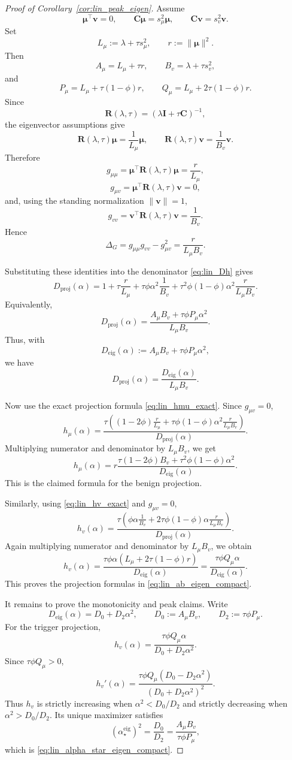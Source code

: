 \documentclass[11pt]{article}
\newcommand{\I}{\mathbf{I}}
\newcommand{\C}{\mathbf{C}}
\newcommand{\bv}{\mathbf{v}}
\newcommand{\bmu}{\boldsymbol{\mu}}
\begin{document}
\begin{proof}[Proof of Corollary~\ref{cor:lin_peak_eigen}]
Assume
\[
\bmu^\top\bv=0,
\qquad
\C\bmu=s_\mu^2\bmu,
\qquad
\C\bv=s_v^2\bv.
\]
Set
\[
L_\mu:=\lambda+\tau s_\mu^2,
\qquad
r:=\|\bmu\|^2.
\]
Then
\[
A_\mu=L_\mu+\tau r,
\qquad
B_v=\lambda+\tau s_v^2,
\]
and
\[
P_\mu=L_\mu+\tau(1-\phi)r,
\qquad
Q_\mu=L_\mu+2\tau(1-\phi)r.
\]
Since
\[
\mathbf{R}(\lambda,\tau)=(\lambda\I+\tau\C)^{-1},
\]
the eigenvector assumptions give
\[
\mathbf{R}(\lambda,\tau)\bmu=\frac{1}{L_\mu}\bmu,
\qquad
\mathbf{R}(\lambda,\tau)\bv=\frac{1}{B_v}\bv.
\]
Therefore
\[
g_{\mu\mu}
=
\bmu^\top \mathbf{R}(\lambda,\tau)\bmu
=
\frac{r}{L_\mu},
\]
\[
g_{\mu v}
=
\bmu^\top \mathbf{R}(\lambda,\tau)\bv
=
0,
\]
and, using the standing normalization \(\|\bv\|=1\),
\[
g_{vv}
=
\bv^\top \mathbf{R}(\lambda,\tau)\bv
=
\frac{1}{B_v}.
\]
Hence
\[
\Delta_G=g_{\mu\mu}g_{vv}-g_{\mu v}^2
=
\frac{r}{L_\mu B_v}.
\]

Substituting these identities into the denominator
\eqref{eq:lin_Dh} gives
\[
D_{\mathrm{proj}}(\alpha)
=
1+\tau\frac{r}{L_\mu}
+
\tau\phi\alpha^2\frac{1}{B_v}
+
\tau^2\phi(1-\phi)\alpha^2\frac{r}{L_\mu B_v}.
\]
Equivalently,
\[
D_{\mathrm{proj}}(\alpha)
=
\frac{
A_\mu B_v+\tau\phi P_\mu\alpha^2
}
{L_\mu B_v}.
\]
Thus, with
\[
D_{\mathrm{eig}}(\alpha):=A_\mu B_v+\tau\phi P_\mu\alpha^2,
\]
we have
\[
D_{\mathrm{proj}}(\alpha)
=
\frac{D_{\mathrm{eig}}(\alpha)}{L_\mu B_v}.
\]

Now use the exact projection formula \eqref{eq:lin_hmu_exact}. Since
\(g_{\mu v}=0\),
\[
h_\mu(\alpha)
=
\frac{
\tau\left((1-2\phi)\frac{r}{L_\mu}
+
\tau\phi(1-\phi)\alpha^2\frac{r}{L_\mu B_v}\right)
}
{
D_{\mathrm{proj}}(\alpha)
}.
\]
Multiplying numerator and denominator by \(L_\mu B_v\), we get
\[
h_\mu(\alpha)
=
r
\frac{
\tau(1-2\phi)B_v+\tau^2\phi(1-\phi)\alpha^2
}
{
D_{\mathrm{eig}}(\alpha)
}.
\]
This is the claimed formula for the benign projection.

Similarly, using \eqref{eq:lin_hv_exact} and \(g_{\mu v}=0\),
\[
h_v(\alpha)
=
\frac{
\tau\left(
\phi\alpha\frac{1}{B_v}
+
2\tau\phi(1-\phi)\alpha\frac{r}{L_\mu B_v}
\right)
}
{
D_{\mathrm{proj}}(\alpha)
}.
\]
Again multiplying numerator and denominator by \(L_\mu B_v\), we obtain
\[
h_v(\alpha)
=
\frac{
\tau\phi\alpha
\left(L_\mu+2\tau(1-\phi)r\right)
}
{
D_{\mathrm{eig}}(\alpha)
}
=
\frac{
\tau\phi Q_\mu\alpha
}
{
D_{\mathrm{eig}}(\alpha)
}.
\]
This proves the projection formulas in \eqref{eq:lin_ab_eigen_compact}.

It remains to prove the monotonicity and peak claims. Write
\[
D_{\mathrm{eig}}(\alpha)=D_0+D_2\alpha^2,
\qquad
D_0:=A_\mu B_v,
\qquad
D_2:=\tau\phi P_\mu .
\]
For the trigger projection,
\[
h_v(\alpha)
=
\frac{\tau\phi Q_\mu\alpha}{D_0+D_2\alpha^2}.
\]
Since \(\tau\phi Q_\mu>0\),
\[
h_v'(\alpha)
=
\frac{
\tau\phi Q_\mu(D_0-D_2\alpha^2)
}
{
(D_0+D_2\alpha^2)^2
}.
\]
Thus \(h_v\) is strictly increasing when \(\alpha^2<D_0/D_2\) and strictly
decreasing when \(\alpha^2>D_0/D_2\). Its unique maximizer satisfies
\[
(\alpha_\star^{\mathrm{eig}})^2
=
\frac{D_0}{D_2}
=
\frac{A_\mu B_v}{\tau\phi P_\mu},
\]
which is \eqref{eq:lin_alpha_star_eigen_compact}.


\end{proof}
\end{document}
